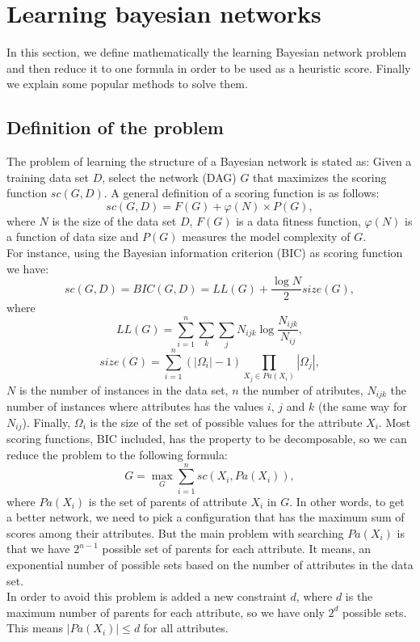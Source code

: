 \section{Learning bayesian networks}
\label{sec:learning}

In this section, we define mathematically the learning Bayesian network problem and then reduce it to one formula in order to be used as a heuristic score. Finally we explain some popular methods to solve them.

\subsection{Definition of the problem}
\label{subsec:definition}

The problem of learning the structure of a Bayesian network is stated as: Given a training data set $D $, select the network (DAG) $G$ that maximizes the scoring function ${sc}( G , D )$.
A general definition of a scoring function is as follows:
	\[ {sc}( G , D ) = F( G ) + \varphi( N ) \times P( G ) ,\]
where $N$ is the size of the data set $D$, $F( G )$ is a data fitness function, $\varphi( N )$ is a function of data size and $P( G )$ measures the model complexity of $G$.\\
For instance, using the Bayesian information criterion (BIC) as scoring function we have:
	\[ {sc}( G , D ) = {BIC}( G , D ) = {LL}( G ) + \frac{\log N}{2} {size}( G ) ,\]
where
	\[ {LL}( G ) = \sum_{i=1}^{n} \sum_{k} \sum_{j} N_{ijk} \log \frac{N_{ijk}}{N_{ij}} ,\]
	\[ {size}( G ) = \sum_{i=1}^{n} ( |\Omega_i| - 1 ) \prod_{X_j \in {Pa}( X_i )} |\Omega_j| ,\]
$N$ is the number of instances in the data set, $n$ the number of atributes, $N_{ijk}$ the number of instances where attributes has the values $i$, $j$ and $k$ (the same way for $N_{ij}$). Finally, $\Omega_i$ is the size of the set of possible values for the attribute $X_i$.
Most scoring functions, BIC included, has the property to be decomposable, so we can reduce the problem to the following formula:
	\[ G = \max_G \sum_{i=1}^n {sc}( X_i , {Pa}( X_i ) ) , \]
where ${Pa}( X_i )$ is the set of parents of attribute $X_i$ in $G$.
In other words, to get a better network, we need to pick a configuration that has the maximum sum of scores among their attributes. But the main problem with searching ${Pa}( X_i)$ is that we have $2^{n-1}$ possible set of parents for each attribute. It means, an exponential number of possible sets based on the number of attributes in the data set.\\
In order to avoid this problem is added a new constraint $d$, where $d$ is the maximum number of parents for each attribute, so we have only $2^d$ possible sets. This means $|{Pa}( X_i )| \leq d$ for all attributes.

